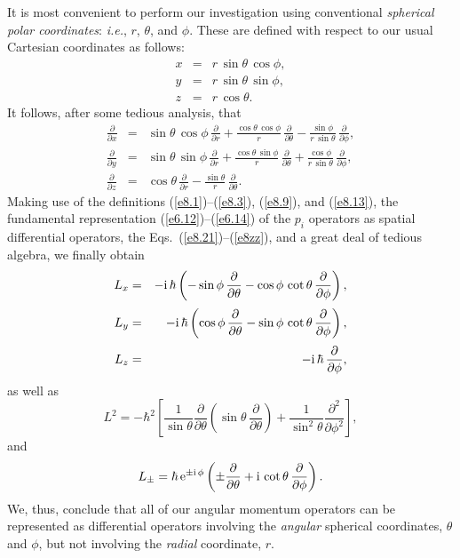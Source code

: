 It is most convenient to perform our investigation using conventional
{\em spherical polar coordinates}: {\em i.e.}, $r$, $\theta$, and $\phi$. These are
defined with respect to our usual Cartesian coordinates as follows:
\begin{eqnarray}\label{e8.21}
x &=& r\,\sin\theta\,\cos\phi,\\[0.5ex]
y&=& r\,\sin\theta\,\sin\phi,\\[0.5ex]
z&=& r\,\cos\theta.\label{e8.23}
\end{eqnarray}
It follows, after some tedious analysis, that
\begin{eqnarray}
\frac{\partial}{\partial x} &=& \sin\theta\,\cos\phi\,\frac{\partial}{\partial r} + \frac{\cos\theta\,\cos\phi}{r}\,\frac{\partial}{\partial\theta} - \frac{\sin\phi}{r\,\sin\theta}\,\frac{\partial}{\partial\phi},\label{e8xx}\\[0.5ex]
\frac{\partial}{\partial y} &=& \sin\theta\,\sin\phi\,\frac{\partial}{\partial r} + \frac{\cos\theta\,\sin\phi}{r}\,\frac{\partial}{\partial\theta} + \frac{\cos\phi}{r\,\sin\theta}\,\frac{\partial}{\partial\phi},\label{e8yy}\\[0.5ex]
\frac{\partial}{\partial z} &=& \cos\theta\,\frac{\partial}{\partial r} -\frac{\sin\theta}{r}\,\frac{\partial}{\partial \theta}.\label{e8zz}
\end{eqnarray}
Making use of the definitions (\ref{e8.1})--(\ref{e8.3}), (\ref{e8.9}), and (\ref{e8.13}), the fundamental representation (\ref{e6.12})--(\ref{e6.14}) of the $p_i$ operators as spatial differential operators, the Eqs.~(\ref{e8.21})--(\ref{e8zz}), and a great deal of tedious algebra, we finally obtain
\begin{eqnarray}
L_x &=& - {\rm i}\,\hbar\left(-\sin\phi\,\frac{\partial}{\partial\theta}
-\cos\phi\,\cot\theta\,\frac{\partial}{\partial\phi}\right),\\[0.5ex]
L_y &=& - {\rm i}\,\hbar\left(\cos\phi\,\frac{\partial}{\partial\theta}
-\sin\phi\,\cot\theta\,\frac{\partial}{\partial\phi}\right),\\[0.5ex]
L_z &=& -{\rm i}\,\hbar\,\frac{\partial}{\partial\phi},\label{e8.26}
\end{eqnarray}
as well as
\begin{equation}
L^2 = -\hbar^2\left[\frac{1}{\sin\theta}\frac{\partial}{\partial\theta}\left(
\sin\theta\,\frac{\partial}{\partial\theta}\right) + \frac{1}{\sin^2\theta}\frac{\partial^2}{\partial\phi^2}\right],
\end{equation}
and
\begin{equation}\label{e8.28}
L_\pm = \hbar\,{\rm e}^{\pm{\rm i}\,\phi}\left(\pm\frac{\partial}{\partial\theta} +{\rm i}\,\cot\theta\,\frac{\partial}{\partial\phi}\right).
\end{equation}
We, thus, conclude that all of our angular momentum operators can be represented
as differential operators involving the {\em angular}\/ spherical
coordinates, $\theta$ and $\phi$, but not involving the {\em radial}\/ coordinate,
$r$.

